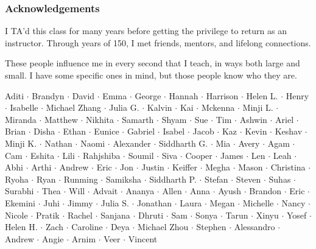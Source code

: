 \documentclass[aspectratio=169, handout]{beamer}
\begin{document}
\begin{frame}[fragile]
  \frametitle{Acknowledgements}

  I TA'd this class for many years before getting the privilege to return as
  an instructor. Through years of 150, I met friends, mentors, and lifelong
  connections.

  \pause
  \vspace{\fill}

  These people influence me in every second that I teach, in ways both large
  and small. I have some specific ones in mind, but those
  people know who they are.

  \pause
  \vspace{-2pt}

  \begin{center}
    Aditi $\cdot$
    Brandyn $\cdot$
    David $\cdot$
    Emma $\cdot$
    George $\cdot$
    Hannah $\cdot$
    Harrison $\cdot$
    Helen L. $\cdot$
    Henry $\cdot$
    Isabelle $\cdot$
    Michael Zhang $\cdot$
    Julia G. $\cdot$
    Kalvin $\cdot$
    Kai $\cdot$
    Mckenna $\cdot$
    Minji L. $\cdot$
    Miranda $\cdot$
    Matthew $\cdot$
    Nikhita $\cdot$
    Samarth $\cdot$
    Shyam $\cdot$
    Sue $\cdot$
    Tim $\cdot$
    Ashwin $\cdot$
    Ariel $\cdot$
    Brian $\cdot$
    Disha $\cdot$
    Ethan $\cdot$
    Eunice $\cdot$
    Gabriel $\cdot$
    Isabel $\cdot$
    Jacob $\cdot$
    Kaz $\cdot$
    Kevin $\cdot$
    Keshav $\cdot$
    Minji K. $\cdot$
    Nathan $\cdot$
    Naomi $\cdot$
    Alexander $\cdot$
    Siddharth G. $\cdot$
    Mia $\cdot$
    Avery $\cdot$
    Agam $\cdot$
    Cam $\cdot$
    Eshita $\cdot$
    Lili $\cdot$
    Rahjshiba $\cdot$
    Soumil $\cdot$
    Siva $\cdot$
    Cooper $\cdot$
    James $\cdot$
    Len $\cdot$
    Leah $\cdot$
    Abhi $\cdot$
    Arthi $\cdot$
    Andrew $\cdot$
    Eric $\cdot$
    Jon $\cdot$
    Justin $\cdot$
    Keiffer $\cdot$
    Megha $\cdot$
    Mason $\cdot$
    Christina $\cdot$
    Ryoha $\cdot$
    Ryan $\cdot$
    Runming  $\cdot$
    Samiksha $\cdot$
    Siddharth P. $\cdot$
    Stefan $\cdot$
    Steven $\cdot$
    Suhas $\cdot$
    Surabhi $\cdot$
    Thea $\cdot$
    Will $\cdot$
    Advait $\cdot$
    Ananya $\cdot$
    Allen $\cdot$
    Anna $\cdot$
    Ayush $\cdot$
    Brandon $\cdot$
    Eric $\cdot$
    Ekemini $\cdot$
    Juhi $\cdot$
    Jimmy $\cdot$
    Julia S. $\cdot$
    Jonathan $\cdot$
    Laura $\cdot$
    Megan $\cdot$
    Michelle $\cdot$
    Nancy $\cdot$
    Nicole $\cdot$
    Pratik $\cdot$
    Rachel $\cdot$
    Sanjana $\cdot$
    Dhruti $\cdot$
    Sam $\cdot$
    Sonya $\cdot$
    Tarun $\cdot$
    Xinyu $\cdot$
    Yosef $\cdot$
    Helen H. $\cdot$
    Zach $\cdot$
    Caroline $\cdot$
    Deya $\cdot$
    Michael Zhou $\cdot$
    Stephen $\cdot$
    Alessandro $\cdot$
    Andrew $\cdot$
    Angie $\cdot$
    Arnim $\cdot$
    Veer $\cdot$
    Vincent
  \end{center}
\end{frame}
\end{document}
